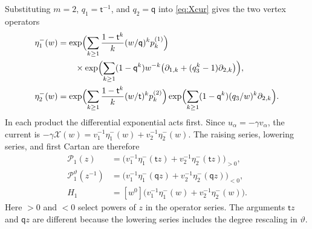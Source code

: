 \documentclass[11pt]{amsart}
\theoremstyle{definition}
\theoremstyle{remark}
\newcommand{\Mq}{\mathsf q}                      %
\newcommand{\Mt}{\mathsf t}                      %
\newcommand{\Cartan}[1]{H_{#1}}                  %
\newcommand{\pk}[2]{p_{#1}^{(#2)}}               %
\newcommand{\Pser}[1]{\mathcal P_{#1}}           %
\newcommand{\Xcur}{\mathcal X}                   %
\begin{document}
Substituting \(m=2\), \(q_1=\Mt^{-1}\), and \(q_2=\Mq\) into
\eqref{eq:Xcur} gives the two vertex operators
\begin{equation}\label{eq:ranktwovertices}
 \begin{aligned}
 \eta^-_1(w)
 &=\exp\Bigl(\sum_{k\geq1}\frac{1-\Mt^k}{k}
                    (w/\Mq)^k\pk{k}{1}\Bigr)\\
 &\qquad{}\times
   \exp\Bigl(\sum_{k\geq1}(1-\Mq^k)w^{-k}
                    \bigl(\partial_{1,k}+(q_3^k-1)\partial_{2,k}\bigr)\Bigr),\\
 \eta^-_2(w)
 &=\exp\Bigl(\sum_{k\geq1}\frac{1-\Mt^k}{k}
                    (w/\Mt)^k\pk{k}{2}\Bigr)
   \exp\Bigl(\sum_{k\geq1}(1-\Mq^k)(q_3/w)^k\partial_{2,k}\Bigr).
 \end{aligned}
\end{equation}
In each product the differential exponential acts first.
Since \(u_\alpha=-\gamma v_\alpha\), the current is
\(-\gamma\Xcur(w)=v_1^{-1}\eta^-_1(w)+v_2^{-1}\eta^-_2(w)\).
The raising series, lowering series, and first Cartan are therefore
\begin{equation}\label{eq:ranktwoparts}
 \begin{aligned}
 \Pser{1}(z)
   &=\bigl(v_1^{-1}\eta^-_1(\Mt z)+v_2^{-1}\eta^-_2(\Mt z)\bigr)_{>0},\\
 \Pser{1}^\vartheta(z^{-1})
   &=\bigl(v_1^{-1}\eta^-_1(\Mq z)+v_2^{-1}\eta^-_2(\Mq z)\bigr)_{<0},\\
 \Cartan{1}
   &=[w^0]\bigl(v_1^{-1}\eta^-_1(w)+v_2^{-1}\eta^-_2(w)\bigr).
 \end{aligned}
\end{equation}
Here \(>0\) and \(<0\) select powers of \(z\) in the operator series.
The arguments \(\Mt z\) and \(\Mq z\) are different because the lowering
series includes the degree rescaling in \(\vartheta\).
\end{document}
